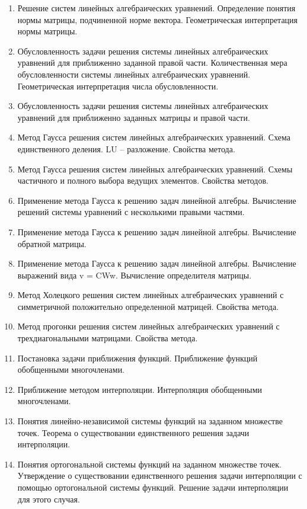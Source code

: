 \documentclass[14pt]{extarticle}
\begin{document}
\begin{enumerate}
    \item Решение систем линейных алгебраических уравнений.  Определение понятия нормы матрицы, подчиненной норме вектора. Геометрическая интерпретация нормы матрицы. 
    \item Обусловленность задачи решения системы линейных алгебраических уравнений для приближенно заданной правой части. Количественная мера обусловленности системы линейных алгебраических уравнений. Геометрическая интерпретация числа обусловленности. 
    \item Обусловленность задачи решения системы линейных алгебраических уравнений для приближенно заданных матрицы и правой части. 
    \item Метод Гаусса решения систем линейных алгебраических уравнений. Схема единственного деления. LU – разложение. Свойства метода. 
    \item Метод Гаусса решения систем линейных алгебраических уравнений. Схемы частичного и полного выбора ведущих элементов. Свойства методов. 
    \item Применение метода Гаусса к решению задач линейной алгебры. Вычисление  решений системы уравнений с несколькими правыми частями. 
    \item Применение метода Гаусса к решению задач линейной алгебры. Вычисление обратной матрицы. 
    \item Применение метода Гаусса к решению задач линейной алгебры. Вычисление выражений вида v = CWw. Вычисление определителя матрицы. 
    \item Метод Холецкого решения систем линейных алгебраических уравнений с симметричной положительно определенной матрицей. Свойства метода. 
    \item Метод прогонки решения систем линейных алгебраических уравнений с трехдиагональными матрицами. Свойства метода. 
    \item Постановка задачи приближения функций. Приближение функций обобщенными многочленами. 
    \item Приближение методом интерполяции. Интерполяция обобщенными многочленами. 
    \item Понятия линейно-независимой системы функций на заданном множестве точек. Теорема о существовании единственного решения задачи интерполяции. 
    \item Понятия ортогональной системы функций на заданном множестве точек. Утверждение о существовании единственного решения задачи интерполяции с помощью ортогональной системы функций. Решение задачи интерполяции для этого случая. 

\end{enumerate}
\end{document}
